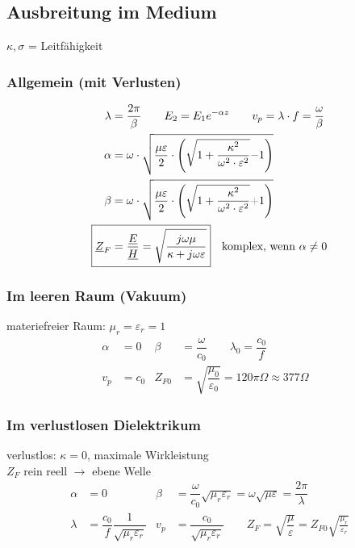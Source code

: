 \subsection{Ausbreitung im Medium}
$ \kappa, \sigma $ = Leitfähigkeit
\subsubsection{Allgemein (mit Verlusten)}
\begin{align*}
	\lambda                 & = \dfrac{2\pi}{\beta} \qquad E_2 = E_1 e^{-\alpha z}         \qquad
	v_p                      = \lambda\cdot f = \dfrac{\omega}{\beta}                                                                                                     \\
	\alpha                  & = \omega \cdot \sqrt{\dfrac{\mu \varepsilon}{2}\cdot \left(\sqrt{1+\dfrac{\kappa^2}{\omega^2\cdot\varepsilon^2}}{\color{red}{-}}1\right)}   \\
	\beta                   & = \omega \cdot \sqrt{\dfrac{\mu \varepsilon}{2}\cdot \left(\sqrt{1+\dfrac{\kappa^2}{\omega^2\cdot\varepsilon^2}}{\color{green}{+}}1\right)} \\
	\Aboxed{\underline{Z}_F & = \dfrac{\underline{E}}{\underline{H}} = \sqrt{\dfrac{j\omega\mu}{\kappa+j\omega\varepsilon}}}\quad\text{komplex, wenn } \alpha \neq 0
\end{align*}

\subsubsection{Im leeren Raum (Vakuum)}
materiefreier Raum: $ \mu_r = \varepsilon_r = 1 $
\begin{align*}
	\alpha & = 0                                                                   &
	\beta  & = \dfrac{\omega}{c_0} \qquad
	\lambda_0                   = \dfrac{c_0}{f}                                     \\
	v_p    & = c_0                                                                 &
	Z_{F0} & = \sqrt{\dfrac{\mu_0}{\varepsilon_0}} = 120 \pi\Omega\approx377\Omega &
\end{align*}
\subsubsection{Im verlustlosen Dielektrikum}
verlustlos: $\kappa =0$, maximale Wirkleistung\\
$Z_F$ rein reell $\rightarrow$ ebene Welle
\begin{align*}
	\alpha  & = 0                                                                                              &
	\beta   & = \dfrac{\omega}{c_0}\sqrt{\mu_r\varepsilon_r}=\omega\sqrt{\mu\varepsilon}=\dfrac{2\pi}{\lambda}   \\
	\lambda & = \dfrac{c_0}{f}\dfrac{1}{\sqrt{\mu_r\varepsilon_r}}                                             &
	v_p     & = \dfrac{c_0}{\sqrt{\mu_r\varepsilon_r}}         \qquad
	\boxed{Z_F = \sqrt{\dfrac{\mu}{\varepsilon}}=Z_{F0}\sqrt{\frac{\mu_r}{\varepsilon_r}}}
\end{align*}

